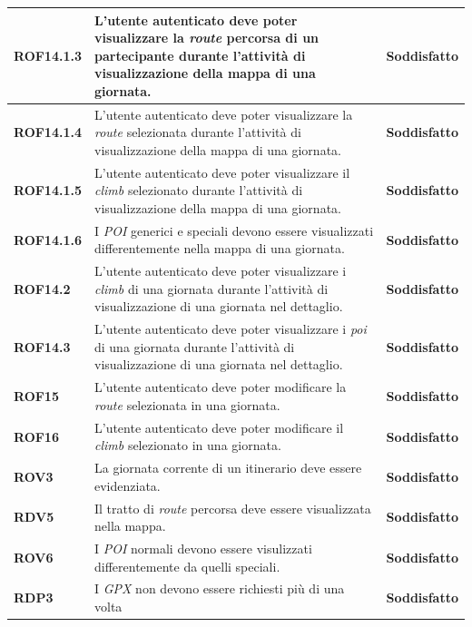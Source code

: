 \begin{longtable}{ |p{2cm}|p{8cm}|p{2cm}|  }
    \textbf{ROF14.1.3} & L'utente autenticato deve poter visualizzare la \textit{route} percorsa di un partecipante durante l'attività di visualizzazione della mappa di una giornata. & \textbf{Soddisfatto}\\ \hline
    \textbf{ROF14.1.4} & L'utente autenticato deve poter visualizzare la \textit{route} selezionata durante l'attività di visualizzazione della mappa di una giornata. & \textbf{Soddisfatto} \\ \hline
    \textbf{ROF14.1.5} & L'utente autenticato deve poter visualizzare il \textit{climb} selezionato durante l'attività di visualizzazione della mappa di una giornata. & \textbf{Soddisfatto} \\ \hline
    \textbf{ROF14.1.6} & I \textit{POI} generici e speciali devono essere visualizzati differentemente nella mappa di una giornata. & \textbf{Soddisfatto} \\ \hline
    \textbf{ROF14.2} & L'utente autenticato deve poter visualizzare i \textit{climb} di una giornata durante l'attività di visualizzazione di una giornata nel dettaglio. & \textbf{Soddisfatto} \\ \hline
    \textbf{ROF14.3} & L'utente autenticato deve poter visualizzare i \textit{poi} di una giornata durante l'attività di visualizzazione di una giornata nel dettaglio. & \textbf{Soddisfatto} \\ \hline
    \textbf{ROF15} & L'utente autenticato deve poter modificare la \textit{route} selezionata in una giornata. & \textbf{Soddisfatto} \\ \hline
    \textbf{ROF16} & L'utente autenticato deve poter modificare il \textit{climb} selezionato in una giornata. & \textbf{Soddisfatto} \\ \hline
    \textbf{ROV3} & La giornata corrente di un itinerario deve essere evidenziata. & \textbf{Soddisfatto} \\ \hline
    \textbf{RDV5} & Il tratto di \textit{route} percorsa deve essere visualizzata nella mappa. & \textbf{Soddisfatto} \\ \hline
    \textbf{ROV6} & I \textit{POI} normali devono essere visulizzati differentemente da quelli speciali. & \textbf{Soddisfatto} \\ \hline
    \textbf{RDP3} & I \textit{GPX} non devono essere richiesti più di una volta & \textbf{Soddisfatto} \\ \hline
\end{longtable}

\newpage
